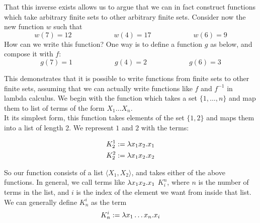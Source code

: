 That this inverse exists allows us to argue that we can in fact construct functions which take arbitrary finite sets to other arbitrary finite sets. Consider now the new function $w$ such that
\begin{equation*}
  w(7) = 12 \hspace{1in} w(4) = 17 \hspace{1in} w(6) = 9
\end{equation*}
How can we write this function? One way is to define a function $g$ as below, and compose it with $f$:
\begin{equation*}
  g(7) = 1 \hspace{1in} g(4) = 2 \hspace{1in} g(6) = 3
\end{equation*}
\begin{center}
\end{center}

This demonstrates that it is possible to write functions from finite sets to other finite sets, assuming that we can actually write functions like $f$ and $f^{-1}$ in lambda calculus. We begin with the function which takes a set $\{1,\ldots,n\}$ and map them to list of terms of the form $X_1\ldots X_n$.\\

It its simplest form, this function takes elements of the set $\{1,2\}$ and maps them into a list of length 2. We represent $1$ and $2$ with the terms:

\begin{eqnarray*}
  K_2^1 := \lambda x_1x_2.x_1\\
  K_2^2 := \lambda x_1x_2.x_2\\
\end{eqnarray*}

So our function consists of a list $\langle X_1,X_2 \rangle$, and takes either of the above functions. In general, we call terms like $\lambda x_1x_2.x_1$ $K_i^n$, where $n$ is the number of terms in the list, and $i$ is the index of the element we want from inside that list. We can generally define $K_n^i$ as the term\\
\begin{equation*}
  K_n^i := \lambda x_1\ldots x_n.x_i
\end{equation*}

